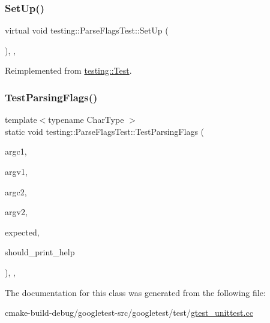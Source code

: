 \mbox{\label{classtesting_1_1ParseFlagsTest_a72fd683f0bc0c2701d9a183c6b20cb48}} 
\subsubsection{\texorpdfstring{SetUp()}{SetUp()}}
{\footnotesize\ttfamily virtual void testing\+::\+Parse\+Flags\+Test\+::\+Set\+Up (\begin{DoxyParamCaption}{ }\end{DoxyParamCaption})\hspace{0.3cm}{\ttfamily [inline]}, {\ttfamily [protected]}, {\ttfamily [virtual]}}



Reimplemented from \mbox{\hyperlink{classtesting_1_1Test_a190315150c303ddf801313fd1a777733}{testing\+::\+Test}}.

\mbox{\label{classtesting_1_1ParseFlagsTest_ad769e5f5a71939c3a9ad853b415fa9d2}} 
\subsubsection{\texorpdfstring{TestParsingFlags()}{TestParsingFlags()}}
{\footnotesize\ttfamily template$<$typename Char\+Type $>$ \\
static void testing\+::\+Parse\+Flags\+Test\+::\+Test\+Parsing\+Flags (\begin{DoxyParamCaption}\item[{int}]{argc1,  }\item[{const Char\+Type $\ast$$\ast$}]{argv1,  }\item[{int}]{argc2,  }\item[{const Char\+Type $\ast$$\ast$}]{argv2,  }\item[{const \mbox{\hyperlink{structtesting_1_1Flags}{Flags}} \&}]{expected,  }\item[{bool}]{should\+\_\+print\+\_\+help }\end{DoxyParamCaption})\hspace{0.3cm}{\ttfamily [inline]}, {\ttfamily [static]}, {\ttfamily [protected]}}



The documentation for this class was generated from the following file\+:\begin{DoxyCompactItemize}
\item 
cmake-\/build-\/debug/googletest-\/src/googletest/test/\mbox{\hyperlink{gtest__unittest_8cc}{gtest\+\_\+unittest.\+cc}}\end{DoxyCompactItemize}
